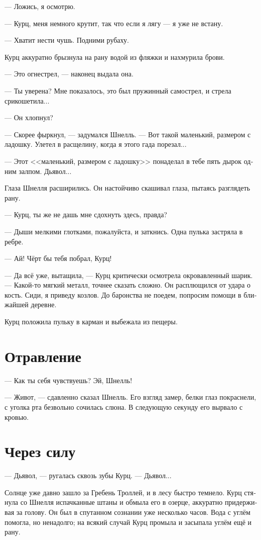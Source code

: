 \documentclass[a4paper,10pt,fleqn]{book}\usepackage{polyglossia}\setdefaultlanguage[babelshorthands=true]{russian}\setotherlanguage{english}\defaultfontfeatures{Ligatures=TeX,Mapping=tex-text}\usepackage{xcolor}\newcommand{\ml}[3]{#2}
\begin{document}
--- Ложись, я осмотрю.

--- Курц, меня немного крутит, так что если я лягу --- я уже не встану.

--- Хватит нести чушь.
Подними рубаху.

Курц аккуратно брызнула на рану водой из фляжки и нахмурила брови.

--- Это огнестрел, --- наконец выдала она.

--- Ты уверена?
Мне показалось, это был пружинный самострел, и стрела срикошетила...

--- Он хлопнул?

--- Скорее фыркнул, --- задумался Шнелль.
--- Вот такой маленький, размером с ладошку.
Улетел в расщелину, когда я этого гада порезал...

--- Этот <<маленький, размером с ладошку>> понаделал в тебе пять дырок одним залпом.
Дьявол...

Глаза Шнелля расширились.
Он настойчиво скашивал глаза, пытаясь разглядеть рану.

--- Курц, ты же не дашь мне сдохнуть здесь, правда?

--- Дыши мелкими глотками, пожалуйста, и заткнись.
Одна пулька застряла в ребре.

--- Ай!
Чёрт бы тебя побрал, Курц!

--- Да всё уже, вытащила, --- Курц критически осмотрела окровавленный шарик.
--- Какой-то мягкий металл, точнее сказать сложно.
Он расплющился от удара о кость.
Сиди, я приведу козлов.
До баронства не поедем, попросим помощи в ближайшей деревне.

Курц положила пульку в карман и выбежала из пещеры.

\section{Отравление}

--- Как ты себя чувствуешь?
Эй, Шнелль!

--- Живот, --- сдавленно сказал Шнелль.
Его взгляд замер, белки глаз покраснели, с уголка рта безвольно сочилась слюна.
В следующую секунду его вырвало с кровью.

\section{Через силу}

--- Дьявол, --- ругалась сквозь зубы Курц.
--- Дьявол...

Солнце уже давно зашло за Гребень Троллей, и в лесу быстро темнело.
Курц стянула со Шнелля испачканные штаны и обмыла его в озерце, аккуратно придерживая за голову.
Он был в спутанном сознании уже несколько часов.
Вода с углём помогла, но ненадолго;
на всякий случай Курц промыла и засыпала углём ещё и рану.
\end{document}
